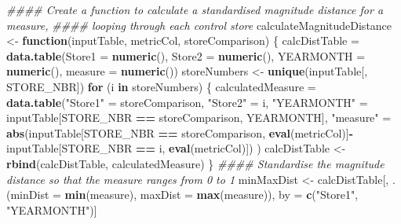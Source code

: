 \documentclass[]{article}
\newenvironment{Shaded}{\begin{snugshade}}{\end{snugshade}}
\newcommand{\CommentTok}[1]{\textcolor[rgb]{0.56,0.35,0.01}{\textit{#1}}}
\newcommand{\ControlFlowTok}[1]{\textcolor[rgb]{0.13,0.29,0.53}{\textbf{#1}}}
\newcommand{\DataTypeTok}[1]{\textcolor[rgb]{0.13,0.29,0.53}{#1}}
\newcommand{\KeywordTok}[1]{\textcolor[rgb]{0.13,0.29,0.53}{\textbf{#1}}}
\newcommand{\NormalTok}[1]{#1}
\newcommand{\OperatorTok}[1]{\textcolor[rgb]{0.81,0.36,0.00}{\textbf{#1}}}
\newcommand{\StringTok}[1]{\textcolor[rgb]{0.31,0.60,0.02}{#1}}
\begin{document}
\begin{Shaded}
\begin{Highlighting}[]
\CommentTok{#### Create a function to calculate a standardised magnitude distance for a measure,}
\CommentTok{#### looping through each control store}
\NormalTok{calculateMagnitudeDistance <-}\StringTok{ }\ControlFlowTok{function}\NormalTok{(inputTable, metricCol, storeComparison) \{}
\NormalTok{  calcDistTable =}\StringTok{ }\KeywordTok{data.table}\NormalTok{(}\DataTypeTok{Store1 =} \KeywordTok{numeric}\NormalTok{(), }
                             \DataTypeTok{Store2 =} \KeywordTok{numeric}\NormalTok{(), }
                             \DataTypeTok{YEARMONTH =} \KeywordTok{numeric}\NormalTok{(), }
                             \DataTypeTok{measure =} \KeywordTok{numeric}\NormalTok{())}
\NormalTok{  storeNumbers <-}\StringTok{ }\KeywordTok{unique}\NormalTok{(inputTable[, STORE_NBR])}
  \ControlFlowTok{for}\NormalTok{ (i }\ControlFlowTok{in}\NormalTok{ storeNumbers) \{}
\NormalTok{    calculatedMeasure =}\StringTok{ }\KeywordTok{data.table}\NormalTok{(}\StringTok{"Store1"}\NormalTok{ =}\StringTok{ }\NormalTok{storeComparison,}
                                   \StringTok{"Store2"}\NormalTok{ =}\StringTok{ }\NormalTok{i,}
                                   \StringTok{"YEARMONTH"}\NormalTok{ =}\StringTok{ }\NormalTok{inputTable[STORE_NBR }\OperatorTok{==}\StringTok{ }\NormalTok{storeComparison,}
\NormalTok{                                                            YEARMONTH], }
                                   \StringTok{"measure"}\NormalTok{ =}\StringTok{ }\KeywordTok{abs}\NormalTok{(inputTable[STORE_NBR }\OperatorTok{==}\StringTok{ }\NormalTok{storeComparison,}
                                                              \KeywordTok{eval}\NormalTok{(metricCol)]}\OperatorTok{-}
\StringTok{                                                   }\NormalTok{inputTable[STORE_NBR }\OperatorTok{==}\StringTok{ }\NormalTok{i,}
                                                              \KeywordTok{eval}\NormalTok{(metricCol)])}
\NormalTok{    )}
\NormalTok{    calcDistTable <-}\StringTok{ }\KeywordTok{rbind}\NormalTok{(calcDistTable, calculatedMeasure)}
\NormalTok{  \}}
\CommentTok{#### Standardise the magnitude distance so that the measure ranges from 0 to 1}
\NormalTok{  minMaxDist <-}\StringTok{ }\NormalTok{calcDistTable[, .(}\DataTypeTok{minDist =} \KeywordTok{min}\NormalTok{(measure), }
                                  \DataTypeTok{maxDist =} \KeywordTok{max}\NormalTok{(measure)), by =}\StringTok{ }\KeywordTok{c}\NormalTok{(}\StringTok{"Store1"}\NormalTok{, }\StringTok{"YEARMONTH"}\NormalTok{)]}

\end{Highlighting}
\end{Shaded}
\end{document}
